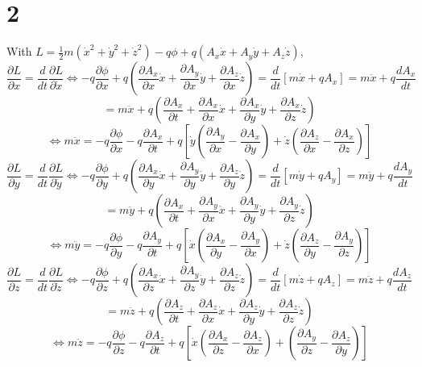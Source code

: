 \documentclass{article}
\begin{document}
\section*{2}
With $L=\frac{1}{2}m(\dot{x}^2+\dot{y}^2+\dot{z}^2)-q\phi+q(A_x\dot{x}+A_y\dot{y}+A_z\dot{z})$,
\[\frac{\partial L}{\partial x}=\frac{d}{dt}\frac{\partial L}{\partial\dot{x}}\Leftrightarrow-q\frac{\partial \phi}{\partial x}+q\left( \frac{\partial A_x}{\partial x}\dot{x}+\frac{\partial A_y}{\partial x}\dot{y}+\frac{\partial A_z}{\partial x}\dot{z} \right)=\frac{d}{dt}\left[  m\dot{x}+qA_x\right]=m\ddot{x}+q\frac{d A_x}{d t}\]
\[=m\ddot{x}+q\left( \frac{\partial A_x}{\partial t}+\frac{\partial A_x}{\partial x}\dot{x}+\frac{\partial A_x}{\partial y}\dot{y}+\frac{\partial A_x}{\partial z}\dot{z} \right)\]
\[\Leftrightarrow m\ddot{x}=-q\frac{\partial\phi}{\partial x}-q\frac{\partial A_x}{\partial t}+q\left[ \dot{y}\left(  \frac{\partial A_y}{\partial x}-\frac{\partial A_x}{\partial y}\right)+\dot{z}\left( \frac{\partial A_z}{\partial x}-\frac{\partial A_x}{\partial z} \right) \right]\]
\[\frac{\partial L}{\partial y}=\frac{d}{dt}\frac{\partial L}{\partial \dot{y}}\Leftrightarrow-q\frac{\partial \phi}{\partial y}+q\left( \frac{\partial A_x}{\partial y}\dot{x}+\frac{\partial A_y}{\partial y}\dot{y}+\frac{\partial A_z}{\partial y}\dot{z} \right)=\frac{d}{dt}[m\dot{y}+qA_y]=m\ddot{y}+q\frac{d A_y}{d t}\]
\[=m\ddot{y}+q\left( \frac{\partial A_x}{\partial t}+\frac{\partial A_y}{\partial x}\dot{x}+\frac{\partial A_y}{\partial y}\dot{y}+\frac{\partial A_y}{\partial z}\dot{z} \right)\]
\[\Leftrightarrow m\ddot{y}=-q\frac{\partial\phi}{\partial y}-q\frac{\partial A_y}{\partial t} + q\left[\dot{x}\left( \frac{\partial A_x}{\partial y}-\frac{\partial A_y}{\partial x} \right)+\dot{z}\left( \frac{\partial A_z}{\partial y}-\frac{\partial A_y}{\partial z} \right)  \right]\]
\[\frac{\partial L}{\partial z}=\frac{d}{dt}\frac{\partial L}{\partial\dot{z}}\Leftrightarrow-q\frac{\partial\phi}{\partial z}+q\left( \frac{\partial A_x}{\partial z}\dot{x}+\frac{\partial A_y}{\partial z}\dot{y}+\frac{\partial A_z}{\partial z}\dot{z} \right)=\frac{d}{dt}[m\dot{z}+qA_z]=m\ddot{z}+q\frac{d A_z}{d t}\]
\[=m\ddot{z}+q\left( \frac{\partial A_z}{\partial t}+\frac{\partial A_z}{\partial x}\dot{x}+\frac{\partial A_z}{\partial y}\dot{y}+\frac{\partial A_z}{\partial z}\dot{z} \right)\]
\[\Leftrightarrow m\ddot{z}=-q\frac{\partial \phi}{\partial z}-q\frac{\partial A_z}{\partial t}+q\left[ \dot{x}\left( \frac{\partial A_x}{\partial z}-\frac{\partial A_z}{\partial x} \right)+\left( \frac{\partial A_y}{\partial z}-\frac{\partial A_z}{\partial y} \right) \right]\]
\end{document}
